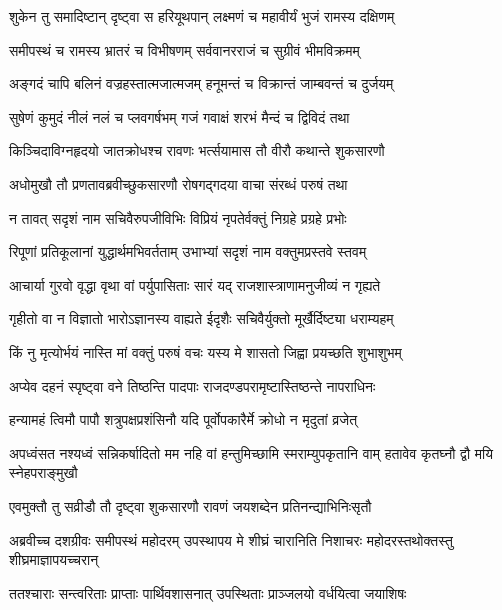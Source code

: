
\twolineshloka
{शुकेन तु समादिष्टान् दृष्ट्वा स हरियूथपान्}
{लक्ष्मणं च महावीर्यं भुजं रामस्य दक्षिणम्} %

\twolineshloka
{समीपस्थं च रामस्य भ्रातरं च विभीषणम्}
{सर्ववानरराजं च सुग्रीवं भीमविक्रमम्} %

\twolineshloka
{अङ्गदं चापि बलिनं वज्रहस्तात्मजात्मजम्}
{हनूमन्तं च विक्रान्तं जाम्बवन्तं च दुर्जयम्} %

\twolineshloka
{सुषेणं कुमुदं नीलं नलं च प्लवगर्षभम्}
{गजं गवाक्षं शरभं मैन्दं च द्विविदं तथा} %

\twolineshloka
{किञ्चिदाविग्नहृदयो जातक्रोधश्च रावणः}
{भर्त्सयामास तौ वीरौ कथान्ते शुकसारणौ} %

\twolineshloka
{अधोमुखौ तौ प्रणतावब्रवीच्छुकसारणौ}
{रोषगद्गदया वाचा संरब्धं परुषं तथा} %

\twolineshloka
{न तावत् सदृशं नाम सचिवैरुपजीविभिः}
{विप्रियं नृपतेर्वक्तुं निग्रहे प्रग्रहे प्रभोः} %

\twolineshloka
{रिपूणां प्रतिकूलानां युद्धार्थमभिवर्तताम्}
{उभाभ्यां सदृशं नाम वक्तुमप्रस्तवे स्तवम्} %

\twolineshloka
{आचार्या गुरवो वृद्धा वृथा वां पर्युपासिताः}
{सारं यद् राजशास्त्राणामनुजीव्यं न गृह्यते} %

\twolineshloka
{गृहीतो वा न विज्ञातो भारोऽज्ञानस्य वाह्यते}
{ईदृशैः सचिवैर्युक्तो मूर्खैर्दिष्ट्या धराम्यहम्} %

\twolineshloka
{किं नु मृत्योर्भयं नास्ति मां वक्तुं परुषं वचः}
{यस्य मे शासतो जिह्वा प्रयच्छति शुभाशुभम्} %

\twolineshloka
{अप्येव दहनं स्पृष्ट्वा वने तिष्ठन्ति पादपाः}
{राजदण्डपरामृष्टास्तिष्ठन्ते नापराधिनः} %

\twolineshloka
{हन्यामहं त्विमौ पापौ शत्रुपक्षप्रशंसिनौ}
{यदि पूर्वोपकारैर्मे क्रोधो न मृदुतां व्रजेत्} %

\threelineshloka
{अपध्वंसत नश्यध्वं सन्निकर्षादितो मम}
{नहि वां हन्तुमिच्छामि स्मराम्युपकृतानि वाम्}
{हतावेव कृतघ्नौ द्वौ मयि स्नेहपराङ्मुखौ} %

\twolineshloka
{एवमुक्तौ तु सव्रीडौ तौ दृष्ट्वा शुकसारणौ}
{रावणं जयशब्देन प्रतिनन्द्याभिनिःसृतौ} %

\threelineshloka
{अब्रवीच्च दशग्रीवः समीपस्थं महोदरम्}
{उपस्थापय मे शीघ्रं चारानिति निशाचरः}
{महोदरस्तथोक्तस्तु शीघ्रमाज्ञापयच्चरान्} %

\twolineshloka
{ततश्चाराः सन्त्वरिताः प्राप्ताः पार्थिवशासनात्}
{उपस्थिताः प्राञ्जलयो वर्धयित्वा जयाशिषः} %

